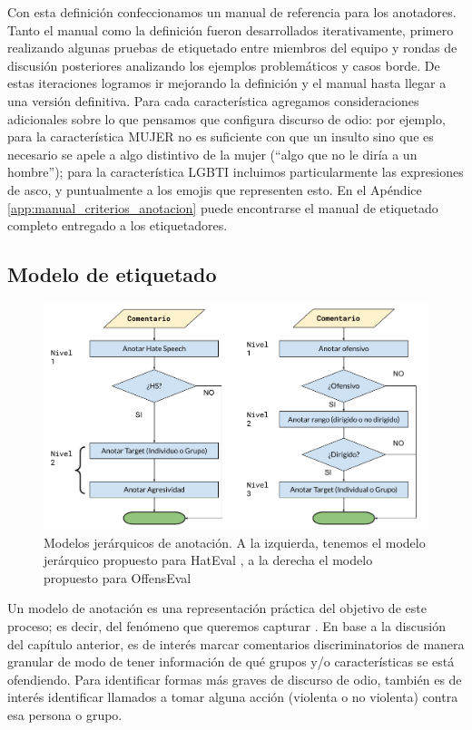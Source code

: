 Con esta definición confeccionamos un manual de referencia para los anotadores. Tanto el manual como la definición fueron desarrollados iterativamente, primero realizando algunas pruebas de etiquetado entre miembros del equipo y rondas de discusión posteriores analizando los ejemplos problemáticos y casos borde. De estas iteraciones logramos ir mejorando la definición y el manual hasta llegar a una versión definitiva. Para cada característica agregamos consideraciones adicionales sobre lo que pensamos que configura discurso de odio: por ejemplo, para la característica MUJER no es suficiente con que un insulto sino que es necesario se apele a algo distintivo de la mujer (``algo que no le diría a un hombre''); para la característica LGBTI incluimos particularmente las expresiones de asco, y puntualmente a los emojis que representen esto. En el Apéndice \ref{app:manual_criterios_anotacion} puede encontrarse el manual de etiquetado completo entregado a los etiquetadores.



\subsection{Modelo de etiquetado}
\label{sec:modelo_etiquetado}

\begin{figure}[t]
    \centering
    \includegraphics[width=\textwidth]{img/05/modelos_jerarquicos.pdf}
    \caption{Modelos jerárquicos de anotación. A la izquierda, tenemos el modelo jerárquico propuesto para HatEval \cite{hateval2019semeval}, a la derecha el modelo propuesto para OffensEval \cite{zampieri2019semeval2019}}
    \label{fig:modelos_offenseval_hateval}
\end{figure}


Un modelo de anotación es una representación práctica del objetivo de este proceso; es decir, del fenómeno que queremos capturar \cite{pustejovsky2012natural}. En base a la discusión del capítulo anterior, es de interés marcar comentarios discriminatorios de manera granular de modo de tener información de qué grupos y/o características se está ofendiendo. Para identificar formas más graves de discurso de odio, también es de interés identificar llamados a tomar alguna acción (violenta o no violenta) contra esa persona o grupo.

